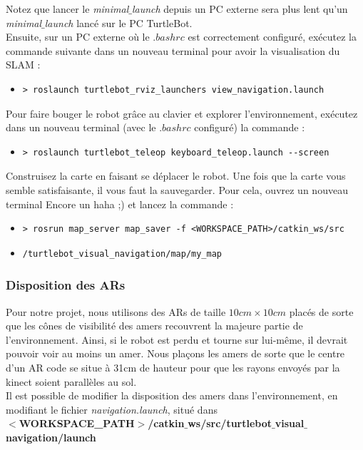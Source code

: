 \documentclass[10pt,a4paper]{article}
\begin{document}
Notez que lancer le \upshape \emph{minimal$\_$launch} depuis un PC externe sera plus lent qu'un \upshape \emph{minimal$\_$launch} lancé sur le PC TurtleBot.\\ 

\vspace{0.5cm}
Ensuite, sur un PC externe où le $.bashrc$ est correctement configuré, exécutez la commande suivante dans un nouveau terminal pour avoir la visualisation du SLAM :

\begin{itemize}
\item[]  \begin{verbatim}> roslaunch turtlebot_rviz_launchers view_navigation.launch \end{verbatim}
\end{itemize}

Pour faire bouger le robot grâce au clavier et explorer l'environnement, exécutez dans un nouveau terminal (avec le $.bashrc$ configuré) la commande :

\begin{itemize}
\item[]  \begin{verbatim}> roslaunch turtlebot_teleop keyboard_teleop.launch --screen \end{verbatim}
\end{itemize}

Construisez la carte en faisant se déplacer le robot. Une fois que la carte vous semble satisfaisante, il vous faut la sauvegarder. Pour cela, ouvrez un nouveau terminal Encore un haha ;) et lancez la commande :

\begin{itemize}
\item[]  \begin{verbatim}> rosrun map_server map_saver -f <WORKSPACE_PATH>/catkin_ws/src\end{verbatim}
\item[]  \begin{verbatim}/turtlebot_visual_navigation/map/my_map\end{verbatim}
\end{itemize}

\subsubsection{Disposition des ARs}

Pour notre projet, nous utilisons des ARs de taille $10cm \times 10cm$ placés de sorte que les cônes de visibilité des amers recouvrent la majeure partie de l'environnement. Ainsi, si le robot est perdu et tourne sur lui-même, il devrait pouvoir voir au moins un amer. Nous plaçons les amers de sorte que le centre d'un AR code se situe à 31cm de hauteur pour que les rayons envoyés par la kinect soient parallèles au sol. \\
Il est possible de modifier la disposition des amers dans l'environnement, en modifiant le fichier \upshape \emph{navigation.launch}, situé dans\\ 
\textbf{$<$WORKSPACE\_PATH$>$/catkin$\_$ws/src/turtlebot$\_$visual$\_$navigation/launch} 
\end{document}

